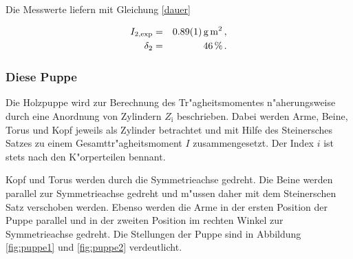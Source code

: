 				Die Messwerte liefern mit Gleichung \eqref{dauer}

				\begin{eqnarray*}
					I_\mathrm{2, exp} & = & \SI{.89 (1)}{\gram \meter \squared} \,, \\
					\delta_2 & = & \SI{46}{\percent} \,.
				\end{eqnarray*}

			\clearpage
			\subsubsection{Diese Puppe}
			\label{subsubsec:puppe}
				Die Holzpuppe wird zur Berechnung des Tr"agheitsmomentes n"aherungsweise durch eine Anordnung von Zylindern $Z_\mathrm{i}$ beschrieben.
				Dabei werden Arme, Beine, Torus und Kopf jeweils als Zylinder betrachtet und mit Hilfe des Steinersches Satzes zu einem Gesamttr"agheitsmoment $I$ zusammengesetzt.
				Der Index $i$ ist stets nach den K"orperteilen bennant.

				Kopf und Torus werden durch die Symmetrieachse gedreht.
				Die Beine werden parallel zur Symmetrieachse gedreht und m"ussen daher mit dem Steinerschen Satz verschoben werden.
				Ebenso werden die Arme in der ersten Position der Puppe parallel und in der zweiten Position im rechten Winkel zur Symmetrieachse gedreht. Die Stellungen der Puppe sind in Abbildung \ref{fig:puppe1} und \ref{fig:puppe2} verdeutlicht.


